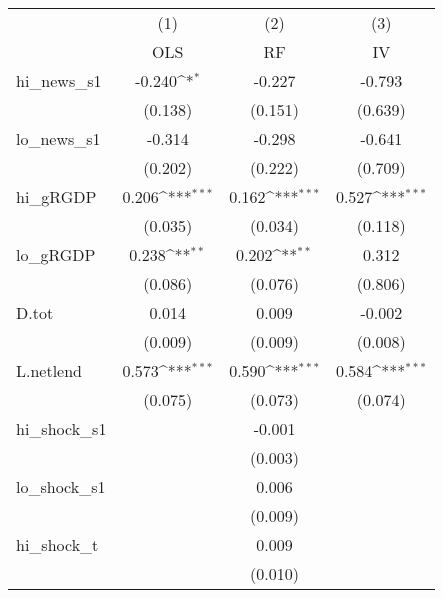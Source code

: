 {
\def\sym#1{\ifmmode^{#1}\else\(^{#1}\)\fi}
\begin{tabular}{l*{3}{c}}
\toprule
            &\multicolumn{1}{c}{(1)}&\multicolumn{1}{c}{(2)}&\multicolumn{1}{c}{(3)}\\
            &\multicolumn{1}{c}{OLS}&\multicolumn{1}{c}{RF}&\multicolumn{1}{c}{IV}\\
\midrule
hi\_news\_s1  &      -0.240\sym{*}  &      -0.227         &      -0.793         \\
            &     (0.138)         &     (0.151)         &     (0.639)         \\
\addlinespace
lo\_news\_s1  &      -0.314         &      -0.298         &      -0.641         \\
            &     (0.202)         &     (0.222)         &     (0.709)         \\
\addlinespace
hi\_gRGDP    &       0.206\sym{***}&       0.162\sym{***}&       0.527\sym{***}\\
            &     (0.035)         &     (0.034)         &     (0.118)         \\
\addlinespace
lo\_gRGDP    &       0.238\sym{**} &       0.202\sym{**} &       0.312         \\
            &     (0.086)         &     (0.076)         &     (0.806)         \\
\addlinespace
D.tot       &       0.014         &       0.009         &      -0.002         \\
            &     (0.009)         &     (0.009)         &     (0.008)         \\
\addlinespace
L.netlend   &       0.573\sym{***}&       0.590\sym{***}&       0.584\sym{***}\\
            &     (0.075)         &     (0.073)         &     (0.074)         \\
\addlinespace
hi\_shock\_s1 &                     &      -0.001         &                     \\
            &                     &     (0.003)         &                     \\
\addlinespace
lo\_shock\_s1 &                     &       0.006         &                     \\
            &                     &     (0.009)         &                     \\
\addlinespace
hi\_shock\_t  &                     &       0.009         &                     \\
            &                     &     (0.010)         &                     \\

\end{tabular}}
